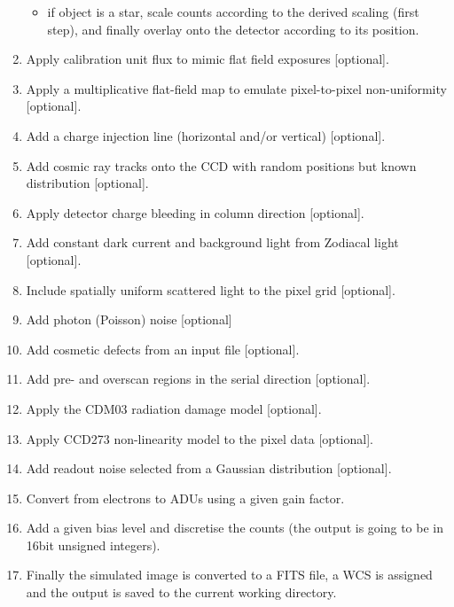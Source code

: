 \documentclass[a4paper,11pt,english]{sphinxmanual}
\begin{document}
\begin{enumerate}
\begin{itemize}
\item {} 
if object is a star, scale counts according to the derived
scaling (first step), and finally overlay onto the detector according to its position.

\end{itemize}

\item {} 
Apply calibration unit flux to mimic flat field exposures {[}optional{]}.

\item {} 
Apply a multiplicative flat-field map to emulate pixel-to-pixel non-uniformity {[}optional{]}.

\item {} 
Add a charge injection line (horizontal and/or vertical) {[}optional{]}.

\item {} 
Add cosmic ray tracks onto the CCD with random positions but known distribution {[}optional{]}.

\item {} 
Apply detector charge bleeding in column direction {[}optional{]}.

\item {} 
Add constant dark current and background light from Zodiacal light {[}optional{]}.

\item {} 
Include spatially uniform scattered light to the pixel grid {[}optional{]}.

\item {} 
Add photon (Poisson) noise {[}optional{]}

\item {} 
Add cosmetic defects from an input file {[}optional{]}.

\item {} 
Add pre- and overscan regions in the serial direction {[}optional{]}.

\item {} 
Apply the CDM03 radiation damage model {[}optional{]}.

\item {} 
Apply CCD273 non-linearity model to the pixel data {[}optional{]}.

\item {} 
Add readout noise selected from a Gaussian distribution {[}optional{]}.

\item {} 
Convert from electrons to ADUs using a given gain factor.

\item {} 
Add a given bias level and discretise the counts (the output is going to be in 16bit unsigned integers).

\item {} 
Finally the simulated image is converted to a FITS file, a WCS is assigned
and the output is saved to the current working directory.

\end{enumerate}
\end{document}
